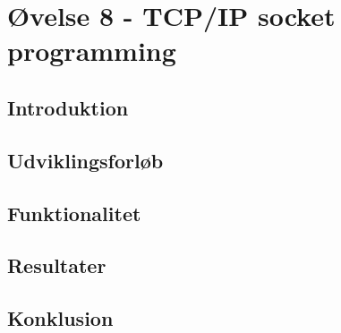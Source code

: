 \section{Øvelse 8 - TCP/IP socket programming}

\subsection{Introduktion}

\subsection{Udviklingsforløb}

\subsection{Funktionalitet}

\subsection{Resultater}

\subsection{Konklusion}
